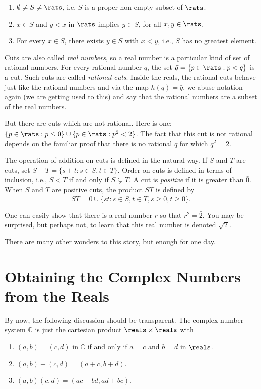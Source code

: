 \begin{enumerate}
\item $\emptyset\neq S\neq \rats$, i.e, $S$ is a proper non-empty subset
of $\rats$.
\item $x\in S$ and $y<x$ in $\rats$ implies $y\in S$, for all $x,y\in \rats$.
\item For every $x\in S$, there exists $y\in S$ with $x<y$, i.e., 
$S$ has no greatest element.
\end{enumerate}

Cuts are also called \textit{real numbers}, so a real number is
a particular kind of set of rational numbers.
For every rational number $q$, the set $\bar{q}= \{p\in \rats: p< q\}$
is a cut.  Such cuts are called \textit{rational cuts}.  Inside
the reals, the rational cuts behave just like the rational
numbers and via the map $h(q)=\bar{q}$, we abuse notation again
(we are getting used to this) and say that
the rational numbers are a subset of the real numbers.  

But there are cuts which are not rational.  Here is one:
$\{p\in \rats: p\le 0\}\cup \{p\in \rats: p^2<2\}$.  The fact that
this cut is not rational depends on the familiar proof that
there is no rational $q$ for which $q^2=2$.

The operation of addition on cuts is defined in the natural
way.  If $S$ and $T$ are cuts, set $S+T=\{s+t:s\in S, t\in T\}$.
Order on cuts is defined in terms of inclusion, i.e., $S<T$ if and
only if $S\subsetneq T$.  A cut is \textit{positive} if it
is greater than $\bar{0}$.  When $S$ and $T$ are positive
cuts, the product $ST$ is defined by
\[
ST= \bar{0}\cup\{st:s\in S, t\in T, s\ge0, t\ge 0\}.
\]

One can easily show that there is a real number $r$ so that
$r^2=\bar{2}$.  You may be surprised, but perhaps not, to learn
that this real number is denoted $\sqrt2$.

There are many other wonders to this story, but enough for
one day.

\section{Obtaining the Complex Numbers from the Reals}

By now, the following discussion should be transparent.
The complex number system $\mathbb{C}$ is just the cartesian product
$\reals\times\reals$ with 
\begin{enumerate}
\item $(a,b) = (c,d)$ in $\mathbb{C}$ if and only if $a=c$ and $b=d$
in $\reals$.
\item $(a,b)+(c,d)=(a+c,b+d)$.
\item $(a,b)(c,d)=(ac-bd, ad+bc)$.
\end{enumerate}

